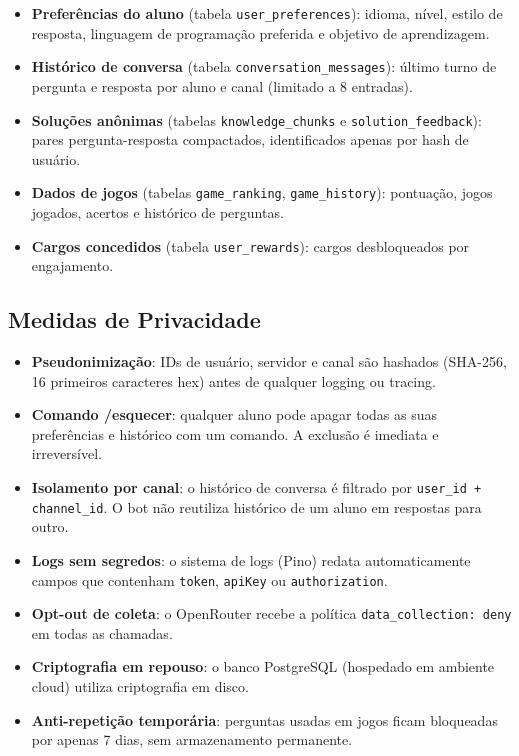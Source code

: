 \documentclass[11pt,a4paper]{article}
\begin{document}
\begin{itemize}[leftmargin=1.5em, itemsep=0.3em]
  \item \textbf{Preferências do aluno} (tabela \texttt{user\_preferences}): idioma, nível, estilo de resposta, linguagem de programação preferida e objetivo de aprendizagem.
  \item \textbf{Histórico de conversa} (tabela \texttt{conversation\_messages}): último turno de pergunta e resposta por aluno e canal (limitado a 8 entradas).
  \item \textbf{Soluções anônimas} (tabelas \texttt{knowledge\_chunks} e \texttt{solution\_feedback}): pares pergunta-resposta compactados, identificados apenas por hash de usuário.
  \item \textbf{Dados de jogos} (tabelas \texttt{game\_ranking}, \texttt{game\_history}): pontuação, jogos jogados, acertos e histórico de perguntas.
  \item \textbf{Cargos concedidos} (tabela \texttt{user\_rewards}): cargos desbloqueados por engajamento.
\end{itemize}

\subsection{Medidas de Privacidade}

\begin{itemize}[leftmargin=1.5em, itemsep=0.3em]
  \item \textbf{Pseudonimização}: IDs de usuário, servidor e canal são hashados (SHA-256, 16 primeiros caracteres hex) antes de qualquer logging ou tracing.
  \item \textbf{Comando /esquecer}: qualquer aluno pode apagar todas as suas preferências e histórico com um comando. A exclusão é imediata e irreversível.
  \item \textbf{Isolamento por canal}: o histórico de conversa é filtrado por \texttt{user\_id + channel\_id}. O bot não reutiliza histórico de um aluno em respostas para outro.
  \item \textbf{Logs sem segredos}: o sistema de logs (Pino) redata automaticamente campos que contenham \texttt{token}, \texttt{apiKey} ou \texttt{authorization}.
  \item \textbf{Opt-out de coleta}: o OpenRouter recebe a política \texttt{data\_collection: deny} em todas as chamadas.
  \item \textbf{Criptografia em repouso}: o banco PostgreSQL (hospedado em ambiente cloud) utiliza criptografia em disco.
  \item \textbf{Anti-repetição temporária}: perguntas usadas em jogos ficam bloqueadas por apenas 7 dias, sem armazenamento permanente.
\end{itemize}
\end{document}
